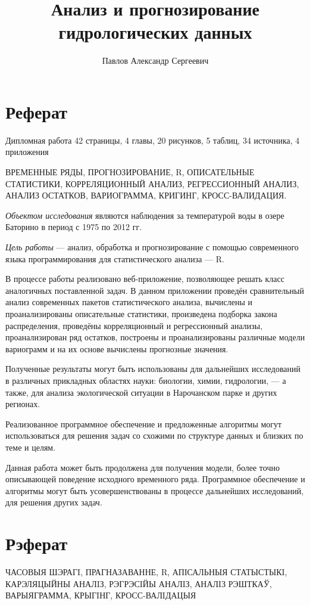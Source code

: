 \documentclass[a4paper,12pt]{report}
\title{Анализ и прогнозирование гидрологических данных}
\author{Павлов Александр Сергеевич}
\begin{document}
	\maketitle
	\newpage

	\chapter*{Реферат}
	Дипломная работа 42 страницы, 4 главы, 20 рисунков, 5 таблиц, 34 источника, 4 приложения

	ВРЕМЕННЫЕ РЯДЫ, ПРОГНОЗИРОВАНИЕ, R, ОПИСАТЕЛЬНЫЕ СТАТИСТИКИ, КОРРЕЛЯЦИОННЫЙ АНАЛИЗ, РЕГРЕССИОННЫЙ АНАЛИЗ, АНАЛИЗ ОСТАТКОВ, ВАРИОГРАММА, КРИГИНГ, КРОСС-ВАЛИДАЦИЯ.

	\textit{Объектом исследования} являются наблюдения за температурой воды в озере Баторино в период с 1975 по 2012 гг.

	\textit{Цель работы} --- анализ, обработка и прогнозирование с помощью современного языка программирования для статистического анализа --- R.

	В процессе работы реализовано веб-приложение, позволяющее решать класс аналогичных поставленной задач. В данном приложении проведён сравнительный анализ современных пакетов статистического анализа, вычислены и проанализированы описательные статистики, произведена подборка закона распределения, проведёны корреляционный и регрессионный анализы, проанализирован ряд остатков, построены и проанализированы различные модели вариограмм и на их основе вычислены прогнозные значения.

	Полученные результаты могут быть использованы для дальнейших исследований в различных прикладных областях науки: биологии, химии, гидрологии, --- а также, для анализа экологической ситуации в Нарочанском парке и других регионах.

	Реализованное программное обеспечение и предложенные алгоритмы могут использоваться для решения задач со схожими по структуре данных и близких по теме и целям.

	Данная работа может быть продолжена для получения модели, более точно описывающей поведение исходного временного ряда. Программное обеспечение и алгоритмы могут быть усовершенствованы в процессе дальнейших исследований, для решения других задач.

	\newpage

	\chapter*{Рэферат}
	ЧАСОВЫЯ ШЭРАГI, ПРАГНАЗАВАННЕ, R, АПІСАЛЬНЫЯ СТАТЫСТЫКI, КАРЭЛЯЦЫЙНЫ АНАЛIЗ, РЭГРЭСIЙЫ АНАЛIЗ, АНАЛIЗ РЭШТКАЎ, ВАРЫЯГРАММА, КРЫГIНГ, КРОСС-ВАЛIДАЦЫЯ
\end{document}
